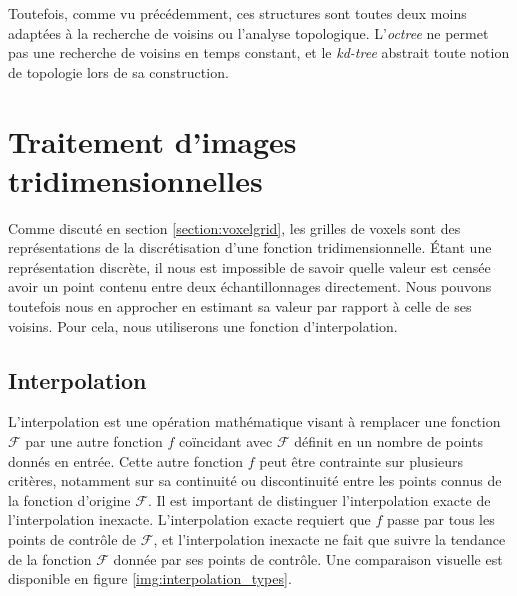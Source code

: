 {{{			Toutefois, comme vu précédemment, ces structures sont toutes deux moins adaptées à la recherche de voisins ou l'analyse topologique. L'\textit{octree} ne permet pas une recherche de voisins en temps constant, et le \textit{kd-tree} abstrait toute notion de topologie lors de sa construction.
		}
    }
	
	\section{Traitement d'images tridimensionnelles}
	{
		Comme discuté en section \ref{section:voxelgrid}, les grilles de voxels sont des représentations de la discrétisation d'une fonction tridimensionnelle. Étant une représentation discrète, il nous est impossible de savoir quelle valeur est censée avoir un point contenu entre deux échantillonnages directement. Nous pouvons toutefois nous en approcher en estimant sa valeur par rapport à celle de ses voisins. Pour cela, nous utiliserons une fonction d'interpolation.

		\subsection{Interpolation}\label{subsection:interpolation}
		{
		
		    L'interpolation est une opération mathématique visant à remplacer une fonction $\mathcal{F}$ par une autre fonction $f$ coïncidant avec $\mathcal{F}$ définit en un nombre de points donnés en entrée. Cette autre fonction $f$ peut être contrainte sur plusieurs critères, notamment sur sa continuité ou discontinuité entre les points connus de la fonction d'origine $\mathcal{F}$. Il est important de distinguer l'interpolation exacte de l'interpolation inexacte. L'interpolation exacte requiert que $f$ passe par tous les points de contrôle de $\mathcal{F}$, et l'interpolation inexacte ne fait que suivre la tendance de la fonction $\mathcal{F}$ donnée par ses points de contrôle. Une comparaison visuelle est disponible en figure \ref{img:interpolation_types}.

}}}
